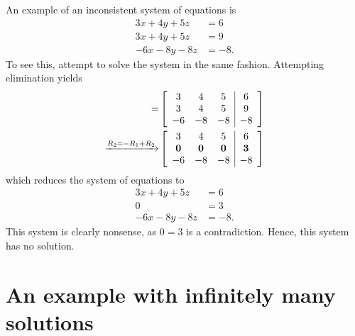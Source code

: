 \documentclass[10pt]{article}
\begin{document}
An example of an inconsistent system of equations is 
\begin{align*}
3x + 4y + 5z & = 6 \\
3x + 4y + 5z & = 9 \\
-6x - 8y - 8z & = -8.
\end{align*}
To see this, attempt to solve the system in the same fashion. Attempting elimination yields 
\begin{align*} 
[A \, | b]  = & \left[ \begin{array}{ccc|ccc|c}
3 & 4 & 5 &  6 \\
3 & 4 & 5 &  9 \\
-6 & -8 & -8 &  -8
\end{array}\right] \\
\xrightarrow{R_2 = - R_1 + R_2} 
& \left[ \begin{array}{ccc|ccc|c}
3 & 4 & 5  & 6 \\
{\bf 0} & {\bf 0} & {\bf 0} &  {\bf 3} \\ 
-6 & -8 & -8 &  -8
\end{array}\right] 
\end{align*}
which reduces the system of equations to 
\begin{align*}
3x + 4y + 5z & = 6 \\
0 & = 3 \\
-6x - 8y - 8z & = -8.
\end{align*}
This system is clearly nonsense, as $0 = 3$ is a contradiction. Hence, this system has no solution.


\section{An example with infinitely many solutions}
\end{document}
